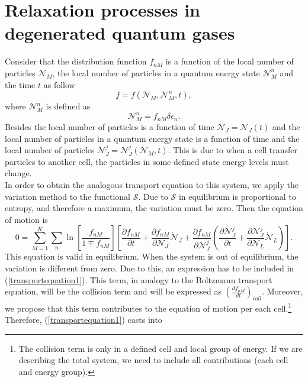 \documentclass{article}
\newcommand{\Ss}{\mathcal{S}}
\begin{document}

  \section{Relaxation processes in degenerated quantum gases}
Consider that the distribution function $f_{nM}$ is a function of the local number of particles $\mathcal{N}_M$, the local number of particles in a quantum energy state $\mathcal{N}_{M}^{n}$ and the time $t$ as follow
\begin{equation}
    f=f(\mathcal{N}_M,\mathcal{N}_M^{n},t),
\end{equation}
where $\mathcal{N}_{M}^{n}$ is defined as
\begin{equation}
    \mathcal{N}_{M}^{n}= f_{nM} \delta \epsilon_n.
\end{equation}
Besides the local number of particles is a function of time $\mathcal{N}_J=\mathcal{N}_J(t)$ and the local number of particles in a quantum energy state is a function of time and the local number of particles $\mathcal{N}_J^{j}=\mathcal{N}_J^{j}(\mathcal{N}_M,t)$. This is due to when a cell transfer particles to another cell, the particles in some defined state energy levels must change.\\
In order to obtain the analogous transport equation to this system, we apply the variation method to the functional $\Ss$. Due to $\Ss$ in equilibrium is proportional to entropy, and therefore a maximum, the variation must be zero. Then the equation of motion is
\begin{equation}
    0=\sum_{M=1}^{K} \sum_n \ln \left[ \frac{f_{nM}}{1\mp f_{nM}} \right] \left[ \frac{\partial f_{nM}}{\partial t}+\frac{\partial f_{nM}}{\partial \mathcal{N}_J}\dot{\mathcal{N}}_J+\frac{\partial f_{nM}}{\partial \mathcal{N}_J^{j}}\left( \frac{\partial \mathcal{N}_J^{j}}{\partial t}+\frac{\partial \mathcal{N}_J^{j}}{\partial \mathcal{N}_L}\dot{\mathcal{N}}_L \right) \right]. \label{transportequation1}
\end{equation}
This equation is valid in equilibrium. When the system is out of equilibrium, the variation is different from zero. Due to this, an expression has to be included in (\ref{transportequation1}). This term, in analogy to the Boltzmann transport equation, will be the collision term and will be expressed as $\left( \frac{df_{nM}}{dt} \right)_{coll}$. Moreover, we propose that this term contributes to the equation of motion per each cell.\footnote{The collision term is only in a defined cell and local group of energy. If we are describing the total system, we need to include all contributions (each cell and energy group).} Therefore, (\ref{transportequation1}) casts into
\end{document}
